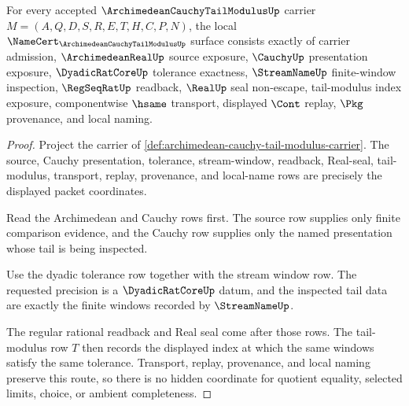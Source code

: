 \begin{theorem}
\label{thm:archimedean-cauchy-tail-modulus-namecert-obligations}
For every accepted $\ArchimedeanCauchyTailModulusUp$ carrier $M=(A,Q,D,S,R,E,T,H,C,P,N)$, the local $\NameCert_{\ArchimedeanCauchyTailModulusUp}$ surface consists exactly of carrier admission, $\ArchimedeanRealUp$ source exposure, $\CauchyUp$ presentation exposure, $\DyadicRatCoreUp$ tolerance exactness, $\StreamNameUp$ finite-window inspection, $\RegSeqRatUp$ readback, $\RealUp$ seal non-escape, tail-modulus index exposure, componentwise $\hsame$ transport, displayed $\Cont$ replay, $\Pkg$ provenance, and local naming.
\end{theorem}
\begin{proof}
Project the carrier of \autoref{def:archimedean-cauchy-tail-modulus-carrier}. The source, Cauchy presentation, tolerance, stream-window, readback, Real-seal, tail-modulus, transport, replay, provenance, and local-name rows are precisely the displayed packet coordinates.

Read the Archimedean and Cauchy rows first. The source row supplies only finite comparison evidence, and the Cauchy row supplies only the named presentation whose tail is being inspected.

Use the dyadic tolerance row together with the stream window row. The requested precision is a $\DyadicRatCoreUp$ datum, and the inspected tail data are exactly the finite windows recorded by $\StreamNameUp$.

The regular rational readback and Real seal come after those rows. The tail-modulus row $T$ then records the displayed index at which the same windows satisfy the same tolerance. Transport, replay, provenance, and local naming preserve this route, so there is no hidden coordinate for quotient equality, selected limits, choice, or ambient completeness.
\end{proof}

